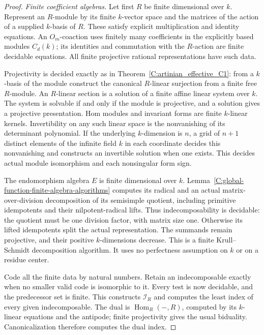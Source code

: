\begin{proof}
\emph{Finite coefficient algebras.}
Let first $R$ be finite dimensional over $k$.
Represent an $R$-module by its finite
$k$-vector space and the matrices of the
action of a supplied $k$-basis of $R$.
These satisfy explicit multiplication
and identity equations.
An $O_m$-coaction uses finitely many
coefficients in the explicitly based
modules $C_d(k)$; its identities and
commutation with the $R$-action are
finite decidable equations.
All finite projective rational
representations have such data.

Projectivity is decided exactly as
in Theorem~\ref{C:artinian_effective_C1}:
from a $k$-basis of the module construct
the canonical $R$-linear surjection
from a finite free $R$-module.
An $R$-linear section is a solution
of a finite affine linear system
over $k$.
The system is solvable if and only
if the module is projective, and
a solution gives a projective
presentation.
Hom modules and invariant forms
are finite $k$-linear kernels.
Invertibility on any such linear
space is the nonvanishing of its
determinant polynomial.
If the underlying $k$-dimension
is $n$, a grid of $n+1$ distinct
elements of the infinite field
$k$ in each coordinate decides
this nonvanishing and constructs
an invertible solution when one
exists.
This decides actual module
isomorphism and each nonsingular
form sign.

The endomorphism algebra $E$
is finite dimensional over $k$.
Lemma~\ref{C:global-function-finite-algebra-algorithms}
computes its radical and an actual
matrix-over-division decomposition
of its semisimple quotient,
including primitive idempotents
and their nilpotent-radical lifts.
Thus indecomposability is decidable:
the quotient must be one division
factor, with matrix size one.
Otherwise its lifted idempotents
split the actual representation.
The summands remain projective,
and their positive $k$-dimensions
decrease.
This is a finite Krull--Schmidt
decomposition algorithm.
It uses no perfectness assumption
on $k$ or on a residue center.

Code all the finite data by
natural numbers.  Retain an
indecomposable exactly when no
smaller valid code is isomorphic
to it.
Every test is now decidable,
and the predecessor set is
finite.
This constructs $\mathscr I_R$
and computes the least index
of every given indecomposable.
The dual is $\operatorname{Hom}_R(-,R)$,
computed by its $k$-linear
equations and the antipode;
finite projectivity gives the
usual biduality.
Canonicalization therefore
computes the dual index.


\end{proof}
